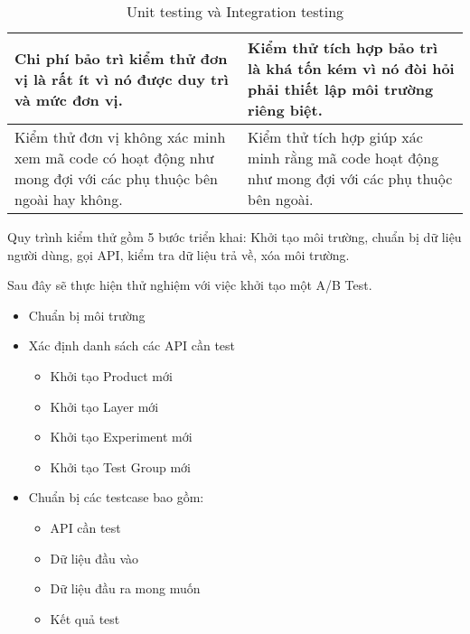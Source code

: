 \begin{table}[H]
\begin{tabular}{|p{8cm}|p{8cm}|}
		Chi phí bảo trì kiểm thử đơn vị là rất ít vì nó được duy trì và mức đơn vị.                                                                               & Kiểm thử tích hợp bảo trì là khá tốn kém vì nó đòi hỏi phải thiết lập môi trường riêng biệt.                                                 \\ \hline
		Kiểm thử đơn vị không xác minh xem mã code có hoạt động như mong đợi với các phụ thuộc bên ngoài hay không.                                               & Kiểm thử tích hợp giúp xác minh rằng mã code hoạt động như mong đợi với các phụ thuộc bên ngoài.                                             \\ \hline
	\end{tabular}
	\caption{Unit testing và Integration testing}
\end{table}

Quy trình kiểm thử gồm 5 bước triển khai: Khởi tạo môi trường, chuẩn bị dữ liệu người dùng, gọi API, kiểm tra dữ liệu trả về, xóa môi trường.


Sau đây sẽ thực hiện thử nghiệm với việc khởi tạo một A/B Test.

\begin{itemize}
	\item Chuẩn bị môi trường
	\item Xác định danh sách các API cần test
	      \begin{itemize}
		      \item Khởi tạo Product mới
		      \item Khởi tạo Layer mới
		      \item Khởi tạo Experiment mới
		      \item Khởi tạo Test Group mới
	      \end{itemize}
	\item Chuẩn bị các testcase bao gồm:
	      \begin{itemize}
		      \item API cần test
		      \item Dữ liệu đầu vào
		      \item Dữ liệu đầu ra mong muốn
		      \item Kết quả test
	      \end{itemize}
\end{itemize}

